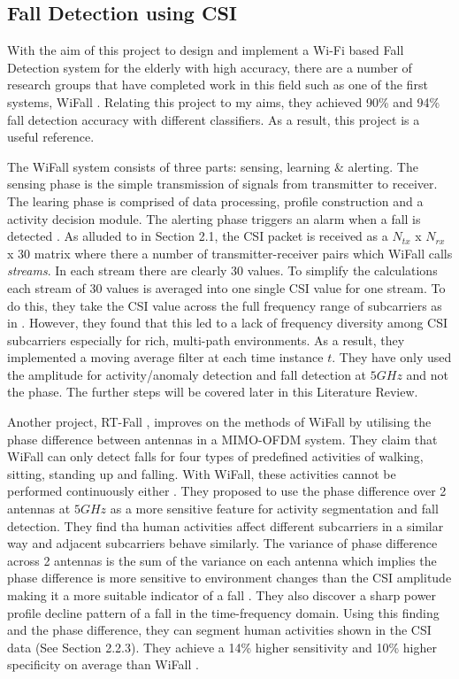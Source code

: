 \subsection{Fall Detection using CSI}
With the aim of this project to design and implement a Wi-Fi based Fall Detection system for the elderly with high accuracy, there are a number of research groups that have completed work in this field such as one of the first systems, WiFall \citep{WiFall}. Relating this project to my aims, they achieved 90\% and 94\% fall detection accuracy with different classifiers. As a result, this project is a useful reference. \par
The WiFall system consists of three parts: sensing, learning \& alerting. The sensing phase is the simple transmission of signals from transmitter to receiver. The learing phase is comprised of data processing, profile construction and a activity decision module. The alerting phase triggers an alarm when a fall is detected \citep{WiFall}. As alluded to in Section 2.1, the CSI packet is received as a $N_{tx}$ x $N_{rx}$ x 30 matrix where there a number of transmitter-receiver pairs which WiFall calls \textit{streams}. In each stream there are clearly 30 values. To simplify the calculations each stream of 30 values is averaged into one single CSI value for one stream. To do this, they take the CSI value across the full frequency range of subcarriers as in \cite{FilaIndoor}. However, they found that this led to a lack of frequency diversity among CSI subcarriers especially for rich, multi-path environments. As a result, they implemented a moving average filter at each time instance $t$. They have only used the amplitude for activity/anomaly detection and fall detection at $5GHz$ and not the phase. The further steps will be covered later in this Literature Review. \par
Another project, RT-Fall \cite{RTFall}, improves on the methods of WiFall by utilising the phase difference between antennas in a MIMO-OFDM system. They claim that WiFall can only detect falls for four types of predefined activities of walking, sitting, standing up and falling. With WiFall, these activities cannot be performed continuously either \citep{RTFall}. They proposed to use the phase difference over 2 antennas at $5GHz$ as a more sensitive feature for activity segmentation and fall detection. They find tha human activities affect different subcarriers in a similar way and adjacent subcarriers behave similarly. The variance of phase difference across 2 antennas is the sum of the variance on each antenna which implies the phase difference is more sensitive to environment changes than the CSI amplitude making it a more suitable indicator of a fall \citep{PhaseU}. They also discover a sharp power profile decline pattern of a fall in the time-frequency domain. Using this finding and the phase difference, they can segment human activities shown in the CSI data (See Section 2.2.3). They achieve a 14\% higher sensitivity and 10\% higher specificity on average than WiFall \citep{RTFall}.

